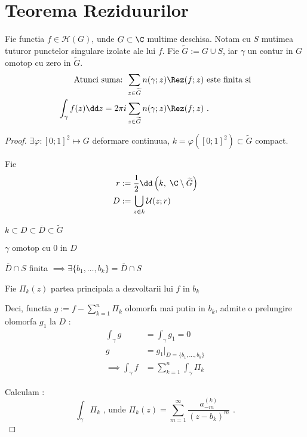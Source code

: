 \section{Teorema Reziduurilor}

\begin{theorem}
    Fie functia $f\in \mathcal{H}(G)$, unde $G \subset \C$ multime deschisa.
    Notam cu $S$  mutimea tuturor punctelor singulare izolate ale lui $f$.
    Fie $\widetilde{G}:=G \cup S $, iar $\gamma$ un contur in $G$ omotop cu zero
     in $\widetilde{G}$.
    \begin{align*}
        \text{Atunci suma: }
        &\sum_{z \in \widetilde{G}} {n(\gamma;z) \Rez(f;z)}
        \text{ este finita si}  \\
        \int_{\gamma} f(z) \dd z = 2\pi i &\sum_{z \in \widetilde{G}} n(\gamma;z) \Rez(f;z) \text{ .}
    \end{align*}
    \begin{proof}
        $\exists \varphi:[0;1]^2 \mapsto G$ deformare continuua,
        $k = \varphi ([0;1]^2) \subset \widetilde{G}$ compact.

        Fie
        \begin{align*}
            r &:= \frac{1}{2} \dd \left(k,\; \C \setminus \widetilde{G}\right)
            \\
            D &:= \bigcup_{z\in k} \mathcal{U}(z;r)
        \end{align*}

        $k \subset D \subset \overline{D} \subset \widetilde{G}$

        $\gamma$ omotop cu $0$ in $D$

        $\overline{D} \cap S$ finita
                $\implies \exists \{b_1, \dotsc, b_k \} = \overline{D} \cap S$

        Fie $\Pi_{k}(z)$ partea principala a dezvoltarii lui $f$ in $b_k$

        Deci, functia $\displaystyle g := f - \sum_{k=1}^{n} \Pi_k$
        olomorfa mai putin in $b_k$, admite o prelungire olomorfa $g_1$ la $D$ :
        \begin{align*}
            \int_{\gamma}  g &= \int_{\gamma} g_1 = 0 \\
                           g &= g_1 |_{D=\{b_1, \dotsc, b_k\}}\\
            \implies \int_{\gamma} f &= \sum_{k=1}^{n} \int_{\gamma} \Pi_k
        \end{align*}

        Calculam :
        \[
            \int_{\gamma} \Pi_k \text{ , unde }
            \Pi_k(z) = \sum_{m=1}^{\infty} \frac{a_{- m}^{(k)} }{(z - b_k)^m}  \text{ .}
        \]


\end{proof}
\end{theorem}

